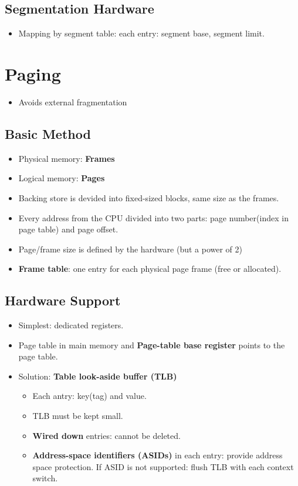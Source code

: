 \documentclass[10pt]{report}
\begin{document}
		\subsection{Segmentation Hardware}
			\begin{itemize}
				\item Mapping by segment table: each entry: segment base, segment limit.
			\end{itemize}

	\section{Paging}
		\begin{itemize}
			\item Avoids external fragmentation
		\end{itemize}
		\subsection{Basic Method}
			\begin{itemize}
				\item Physical memory: \textbf{Frames}
				\item Logical memory: \textbf{Pages}
				\item Backing store is devided into fixed-sized blocks, same size as the frames.
				\item Every address from the CPU divided into two parts: page number(index in page table) and page offset.
				\item Page/frame size is defined by the hardware (but a power of 2)
				\item \textbf{Frame table}: one entry for each physical page frame (free or allocated).
			\end{itemize}

		\subsection{Hardware Support}
			\begin{itemize}
				\item Simplest: dedicated registers.
				\item Page table in main memory and \textbf{Page-table base register} points to the page table.
				\item Solution: \textbf{Table look-aside buffer (TLB)}
				\begin{itemize}
					\item Each antry: key(tag) and value.
					\item TLB must be kept small.
					\item \textbf{Wired down} entries: cannot be deleted.
					\item \textbf{Address-space identifiers (ASIDs)} in each entry: provide address space protection. If ASID is not supported: flush TLB with each context switch.
				\end{itemize}
			\end{itemize}
\end{document}
